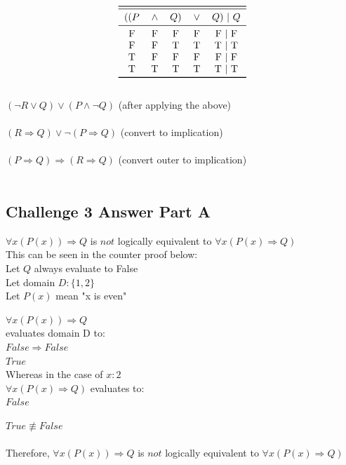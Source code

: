 \documentclass[12pt]{article}
\newcommand{\impl}{\mathbin{\Rightarrow}}
\newcommand\tab[1][1cm]{\hspace*{#1}}
\begin{document}
\[
\begin{tabular}{*{6}{c}}
\toprule
\midrule
${(}{(}P$ & $\land$ & $Q{)}$ & $\lor$ & $Q{)}$ | $Q$ \\
\midrule
   F & F & F & F & F | F\\
   F & F & T & T & T | T\\
   T & F & F & F & F | F\\
   T & T & T & T & T | T\\
\bottomrule
\end{tabular}
\]
\\
$(\neg R \lor Q) \lor (P \land \neg Q)$ \tab (after applying the above) \\\\
$(R \impl Q) \lor \neg (P \impl Q)$ \tab (convert to implication) \\\\
$(P \impl Q) \impl (R \impl Q)$ \tab (convert outer to implication) \\\\

\subsection*{Challenge 3 Answer Part A}
$\forall x (P(x)) \impl Q$ is $not$ logically equivalent to $\forall x (P(x) \impl Q)$ \\
This can be seen in the counter proof below:\\
Let $Q$ always evaluate to False \\
Let domain $D : \{1, 2\}$ \\
Let $P(x)$ mean "x is even"
\begin{multicols}{2}
\setlength{\columnsep}{1cm}
$\forall x (P(x)) \impl Q$\\
evaluates domain D to:\\
$False \impl False$\\ 
$True$\\
Whereas in the case of $x : 2$\\
$\forall x (P(x) \impl Q)$
evaluates to:\\
$False$\\
\end{multicols}
$True \not\equiv False$\\\\
Therefore, $\forall x (P(x)) \impl Q$ is $not$ logically equivalent to $\forall x (P(x) \impl Q)$
\end{document}
